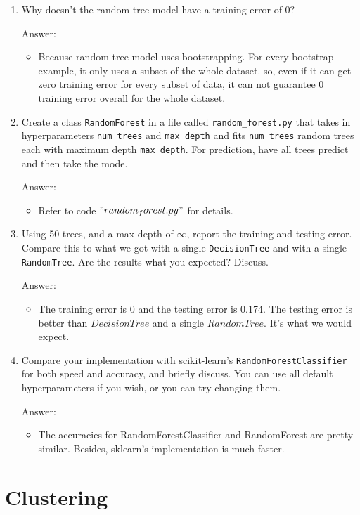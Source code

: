 \documentclass{article}
\def\blu#1{{\color{blu}#1}}
\def\gre#1{{\color{gre}#1}}
\def\enum#1{\begin{enumerate}#1\end{enumerate}}
\begin{document}
\blu{
\enum{
\item Why doesn't the random tree model have a training error of 0?\\
\gre{Answer:
	\begin{itemize}
		\item Because random tree model uses bootstrapping. For every bootstrap example, it only uses a subset of the whole dataset. so, even if it can get zero training error for every subset of data, it can not guarantee 0 training error overall for the whole dataset.
	\end{itemize}
}
\item Create a class \texttt{RandomForest} in a file called \texttt{random\string_forest.py} that takes in hyperparameters \texttt{num\string_trees} and \texttt{max\string_depth} and
fits \texttt{num\string_trees} random trees each with maximum depth \texttt{max\string_depth}. For prediction, have all trees predict and then take the mode. \\
\gre{Answer:
	\begin{itemize}
		\item Refer to code $"random_forest.py" $ for details.
	\end{itemize}}
\item Using 50 trees, and a max depth of $\infty$, report the training and testing error. Compare this to what we got with a single \texttt{DecisionTree} and with a single \texttt{RandomTree}. Are the results what you expected? Discuss. \\
\gre{Answer:
	\begin{itemize}
		\item The training error is 0 and the testing error is 0.174. The testing error is better than $DecisionTree$ and a single $RandomTree$. It's what we would expect.
\end{itemize}}
\item Compare your implementation with scikit-learn's \texttt{RandomForestClassifier} for both speed and accuracy, and briefly discuss. You can use all default hyperparameters if you wish, or you can try changing them. \\
\gre{Answer:
	\begin{itemize}
		\item The accuracies for RandomForestClassifier and RandomForest are pretty similar. Besides, sklearn's implementation is much faster.
\end{itemize}}
}
}

\section{Clustering}
\end{document}
